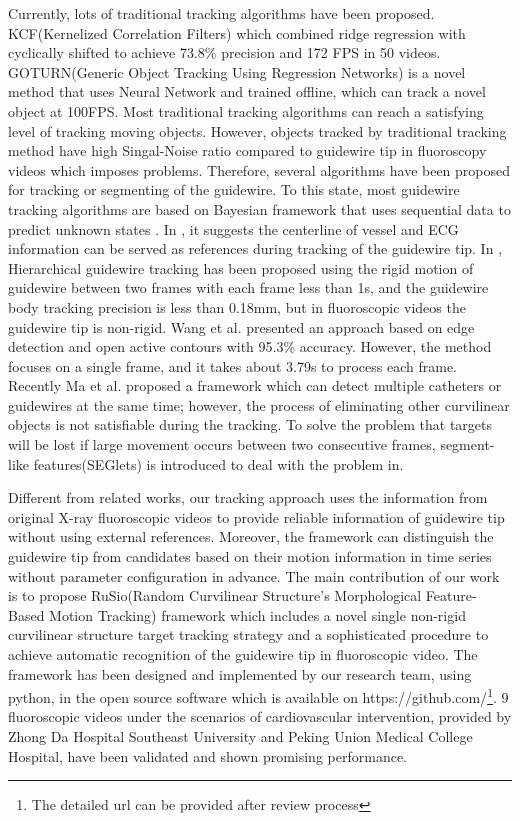\documentclass[journal]{IEEEtran}
\begin{document}
Currently, lots of traditional tracking algorithms have been proposed. KCF(Kernelized Correlation Filters) \cite{Henriques2014High} which combined ridge regression with cyclically shifted to achieve 73.8\% precision and 172 FPS in 50 videos. GOTURN(Generic Object Tracking Using Regression Networks)\cite{held2016learning} is a novel method that uses Neural Network and trained offline, which can track a novel object at 100FPS. Most traditional tracking algorithms can reach a satisfying level of tracking moving objects. However, objects tracked by traditional tracking method have high Singal-Noise ratio compared to guidewire tip in fluoroscopy videos which imposes problems. Therefore, several algorithms have been proposed for tracking or segmenting of the guidewire. To this state, most guidewire tracking algorithms are based on Bayesian framework that uses sequential data to predict unknown states \cite{Isard1998}.
In \cite{bacchuwar2017voidd}, it suggests the centerline of vessel and ECG information can be served as references during tracking of the guidewire tip. 
In \cite{Peng2009Hierarchical}, Hierarchical guidewire tracking has been proposed using the rigid motion of guidewire between two frames with each frame less than 1s, and the guidewire body tracking precision is less than 0.18mm, but in fluoroscopic videos the guidewire tip is non-rigid. Wang et al. \cite{wang2017guide} presented an approach based on edge detection and open active contours with 95.3\% accuracy. However, the method focuses on a single frame, and it takes about 3.79s to process each frame. Recently Ma et al. \cite{ma2018novel} proposed a framework which can detect multiple catheters or guidewires at the same time; however, the process of eliminating other curvilinear objects is not satisfiable during the tracking. To solve the problem that targets will be lost if large movement occurs between two consecutive frames, segment-like features(SEGlets) is introduced to deal with the problem in\cite{vandini2017robust}.

Different from related works, our tracking approach uses the information from original X-ray fluoroscopic videos to provide reliable information of guidewire tip without using external references. Moreover, the framework can distinguish the guidewire tip from candidates based on their motion information in time series without parameter configuration in advance. The main contribution of our work is to propose RuSio(Random Curvilinear Structure's Morphological Feature-Based Motion Tracking) framework which includes a novel single non-rigid curvilinear structure target tracking strategy and a sophisticated procedure to achieve automatic recognition of the guidewire tip in fluoroscopic video. The framework has been designed and implemented by our research team, using python, in the open source software which is available on https://github.com/\footnote{The detailed url can be provided after review process}. 9 fluoroscopic videos under the scenarios of cardiovascular intervention, provided by Zhong Da Hospital Southeast University and Peking Union Medical College Hospital, have been validated and shown promising performance. 
\end{document}
